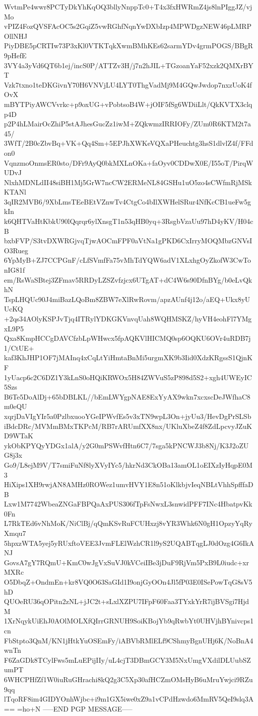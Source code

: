 WvtmPe4wwr8PCTyDkYhKqOQ3bllyNnppTc0+T4x3fxHWRmZ4js8lnPIggJZ/vjMo
vPIZ4FozQVSFAcOC5s2GqiZ5vwRGhfNqnYwDXbIzp4MPWDgzNEW46pLMRPOllNHJ
PiyDBE5pCRTIw73P3xKl0VTKTqkXwmBMhKEs62sarmYDv4grmPOGS/BBgR9pHefE
3VY4a3yVd6QT6b1ej/incS0P/ATTZv3H/j7n2hJIL+TGzoanYaF52xzk2QMXrBYT
Vzk7txno1teDKGivnY70H6VNVjLU4LYT0ThgVadMj9M4GQwJwdop7nxzUoK4fOvX
mBYTPiyAWCVvrkc+p9oxUG+vPobtsoB4W+jOIF5fSg6WDiiLlt/QkKVTX3clqp4D
p2P4hLMairOcZhiP5stAJhesGucZz1iwM+ZQkwmzIRRIOFy/ZUm0R6KTM2t7a45/
3WfT/2B0cZbvBq+VK+Qq4Sm+5EPJhXWKeVQXaPHeuchtg3hsS1dlvlZ4f/FFdon0
VqnzmoOnmsER0sto/DFr9AyQ0bkMXLnOKa+faOyv0CDDwX0E/I55oT/PirqWUDvJ
NlxhMDNLdII48siBH1Mj5GrW7ncCW2ERMeNL84GSHu1uO5zo4sCWfmRjMSkKTANl
3qIR2MVB6/9XbLmsTEeBEtVZnwTv4CtgCo4bIlXWHelSRur4NfKcCB1ueFw5gkIn
k6QHTVaHtKbkU90lQqrqr6ylXnsgT1n53qHB0yq+3RsgbVzaUu97hD4yKV/H04cB
bxbFVP/S3tvDXWRGjvqTjwAOCmFPF0aVtNa1gPKD6CxIrryMOQMbzGNVsIO3Rueg
6YpMyB+ZJ7CCPGnF/cLfSVmfFa75vMhTdYQW6adV1XLxhgOyZkofW3CwTonIG81f
em/RsWaSBtej3ZFmav5RRDyLZSZvfzjcx6UTgAT+dC4W6s90DfnBYg/b0eLvQkhN
TspLHQUc90J4miBazLQoBm8ZBW7eXlRwRovm/apzAUnf4j12o/aEQ+Ukx8yUUcKQ
+2qs34AOlyKSPJvTjq4ITRylYDKGKVnvqUah8WQHMSKZ/hyVH4eohFl7YMgxL9P5
Qxa8KmpHCCgDAVCfzbLpWHwcx5fpAQKVlHICMQ0sp6OQKU6OVr4uRDB7j1/CtUE+
kaf3KhJHP1OF7jMAInq4xCqLtYiHmtaBnMi5urgmXK9b3Iid0XdzKRgssS1QjnKF
1yUacp6c2C6DZ1Y3kLnS0oHQiKRWOx5H84ZWVuS5zP898d5S2+xgh4UWEyIC5Szs
B6Te5DoAlDj+65bDBLKL//bEmLWYgpNAE8ExYyAX9wkn7xcxscDeJWfhaC8m0eQU
xqrjDaVIgYIr5a0PzlbxuooYGeIPWvfEs5v3xTN9wpL3On+jyUu3/HevDgPrSLSb
iBdcDRc/MVMmBMxTKPcM/RB7rARUmfXX8nx/UKluXbeZ4f8ZdLpcvyJZuKD9WTaK
ykObKPYQyYDGx1alA/y2G0mPSWvfHtn6C7/7sga5kPNCWJ3b8Nj/K3J2oZUG8j3x
Go9/L8ejM9V/T7smiFuNf8lyXVyIYc5/hkrNd3CkOBa13amOL1oEIXzIyHqpE0M3
HiXips1XH9rwjAN8AMHz0ROWez1umvHVY1E8n51oKlkbjvIeqNBLtVhhSpfffaDB
Lxw1M7742WbeaZNGaFBPQaAxPUS306fTpFsNwxL3snwidPFF7INc4HbatpvKk0Fn
L7RkTEd6vNhMoK/NiClBj/qQmKSvRuFCUHxzj8vYR3Whk6N0gH1OpzyYqRyXmqu7
5hpxzWTA5yej5yRUxftoVEE3JvmFLElWzhCR1l9yS2UQABTqgLJ0dOzg4G6IkANJ
GovsA7gY7RQmU+KmC0wJgVxSuVJ0kVCeiIBe3jDuF9RjVm5PxB9L0iudc+xrMXRc
O5DbqZ+OndmEn+kr8VQ0O63SaGId1I9onjGyOOn4Jl5fP03E0ISePowTqG8sV5hD
QUOeRU36qOPitn2zNL+jJC2t+sLxlXZPU7IFpF60Faa3TYxkYrR7ijBVSgi7HjdM
1XrNqykUiEhJ0AOlMOLXfQIrrGRNUH9SoiKBojYb9qRwbYt0UHVjhBYnivcps1cn
FbStpto3QnM/KN1jHtkYuOSEmFy/iABVbRMlELf9CShmyBgnUHj6K/NoBnA4wnTn
F6ZaGDk8TCylFws5mLuEPijIIy/uL4cjT3DBmGCY3M5NxUmgVXdilDLUubSZumPT
6WHCPHfZf1W0iuRuGHrachi8kQ2g3C5Xp30afHCZmOMsHyB6uMruYwjci9RZu9qq
lTqoRF8im4GIDYOnhWjbc+i9m1GX5iwe0xZ9a1vCPdHzwdo6MmRV5QeI9slq3A==
=ho+N
-----END PGP MESSAGE-----
